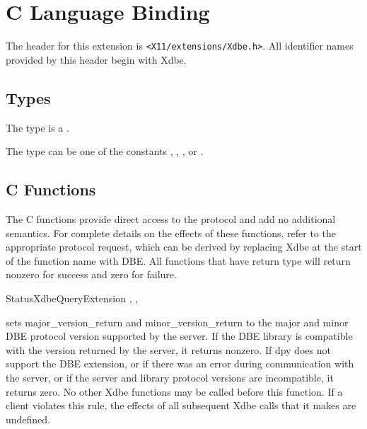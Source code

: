 \section{C Language Binding}

The header for this extension is \verb|<X11/extensions/Xdbe.h>|.  All
identifier names provided by this header begin with Xdbe.

\subsection{Types}

The type  is a .

The type  can be one of the constants
, ,
, or .

\subsection{C Functions}

The C functions provide direct access to the protocol and add no
additional semantics.  For complete details on the effects of these
functions, refer to the appropriate protocol request, which can be
derived by replacing Xdbe at the start of the function name with DBE\@.
All functions that have return type  will return
nonzero for success and zero for failure.

\begin{keeptogether}
\begin{cfunction}{Status}{XdbeQueryExtension}
,
,
\end{cfunction}

 sets major\_version\_return and
minor\_version\_return to the major and minor DBE protocol
version supported by the server.  If the DBE library is compatible
with the version returned by the server, it returns
nonzero.  If dpy does not support the DBE extension, or if
there was an error during communication with the server, or if the
server and library protocol versions are incompatible, it
returns zero.  No other Xdbe functions may be called before this
function.  If a client violates this rule, the effects of all
subsequent Xdbe calls that it makes are undefined.
\end{keeptogether}

